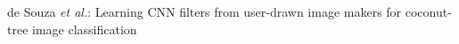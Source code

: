\documentclass[journal, twoside]{IEEEtran}
\begin{document}
\author{Italos~Estilon~de~Souza,~
and~Alexandre~Xavier~Falc\~{a}o,~}

%
{de Souza \MakeLowercase{\textit{et al.}}: Learning CNN filters from user-drawn image makers for coconut-tree image classification}



\end{document}
